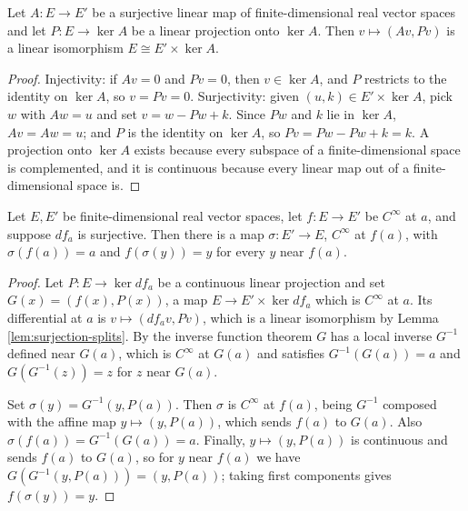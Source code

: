\begin{lemma}
\label{lem:surjection-splits}
\leanok
Let $A : E \to E'$ be a surjective linear map of finite-dimensional real vector spaces and let $P : E \to \ker A$ be a linear projection onto $\ker A$. Then $v \mapsto (Av, Pv)$ is a linear isomorphism $E \cong E' \times \ker A$.
\end{lemma}

\begin{proof}
\leanok
Injectivity: if $Av = 0$ and $Pv = 0$, then $v \in \ker A$, and $P$ restricts to the identity on $\ker A$, so $v = Pv = 0$. Surjectivity: given $(u,k) \in E' \times \ker A$, pick $w$ with $Aw = u$ and set $v = w - Pw + k$. Since $Pw$ and $k$ lie in $\ker A$, $Av = Aw = u$; and $P$ is the identity on $\ker A$, so $Pv = Pw - Pw + k = k$. A projection onto $\ker A$ exists because every subspace of a finite-dimensional space is complemented, and it is continuous because every linear map out of a finite-dimensional space is.
\end{proof}

\begin{proposition}
\label{prop:local-section-euclidean}
\leanok
{}
Let $E, E'$ be finite-dimensional real vector spaces, let $f : E \to E'$ be $C^\infty$ at $a$, and suppose $df_a$ is surjective. Then there is a map $\sigma : E' \to E$, $C^\infty$ at $f(a)$, with $\sigma(f(a)) = a$ and $f(\sigma(y)) = y$ for every $y$ near $f(a)$.
\end{proposition}

\begin{proof}
\leanok
{}
Let $P : E \to \ker df_a$ be a continuous linear projection and set $G(x) = (f(x), P(x))$, a map $E \to E' \times \ker df_a$ which is $C^\infty$ at $a$. Its differential at $a$ is $v \mapsto (df_a v, Pv)$, which is a linear isomorphism by Lemma \ref{lem:surjection-splits}. By the inverse function theorem $G$ has a local inverse $G^{-1}$ defined near $G(a)$, which is $C^\infty$ at $G(a)$ and satisfies $G^{-1}(G(a)) = a$ and $G(G^{-1}(z)) = z$ for $z$ near $G(a)$.

Set $\sigma(y) = G^{-1}(y, P(a))$. Then $\sigma$ is $C^\infty$ at $f(a)$, being $G^{-1}$ composed with the affine map $y \mapsto (y, P(a))$, which sends $f(a)$ to $G(a)$. Also $\sigma(f(a)) = G^{-1}(G(a)) = a$. Finally, $y \mapsto (y, P(a))$ is continuous and sends $f(a)$ to $G(a)$, so for $y$ near $f(a)$ we have $G(G^{-1}(y, P(a))) = (y, P(a))$; taking first components gives $f(\sigma(y)) = y$.
\end{proof}

